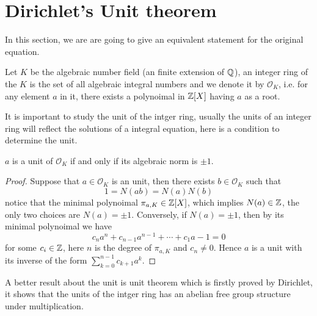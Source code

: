 \section{Dirichlet's Unit theorem}
In this section, we are are going to give an equivalent statement for the original equation.

\begin{definition}
    Let \(K\) be the algebraic number field (an finite extension of \(\mathbb{Q}\)), an integer ring of the \(K\) is the set of all algebraic integral numbers and we denote it by \(\mathcal{O}_K\), i.e. for any element \(a\) in it, there exists a polynoimal in \(\mathbb{Z}[X]\) having \(a\) as a root.
\end{definition}

It is important to study the unit of the intger ring, usually the units of an integer ring will reflect the solutions of a integral equation, here is a condition to determine the unit.

\begin{lemma} \label{unit iff norm 1}
    \(a\) is a unit of \(\mathcal{O}_K\) if and only if its algebraic norm is \(\pm 1\).

    \begin{proof}
        Suppose that \(a \in \mathcal{O}_K\) is an unit, then there exists \(b \in \mathcal{O}_K\) such that
        \[1 = N(ab) = N(a)N(b)\]
        notice that the minimal polynoimal \(\pi_{a,K} \in \mathbb{Z}[X]\), which implies \(N(a) \in \mathbb{Z}\), the only two choices are \(N(a) = \pm 1\). Conversely, if \(N(a) = \pm 1\), then by its minimal polynoimal we have
        \[c_na^n+c_{n-1}a^{n-1}+\cdots + c_1a-1 = 0\]
        for some \(c_i \in \mathbb{Z}\), here \(n\) is the degree of \(\pi_{a,K}\) and \(c_n \neq 0\). Hence \(a\) is a unit with its inverse of the form \(\sum_{k=0}^{n-1}c_{k+1}a^k\).
    \end{proof}
\end{lemma}

A better result about the unit is unit theorem which is firstly proved by Dirichlet, it shows that the units of the intger ring has an abelian free group structure under multiplication.

